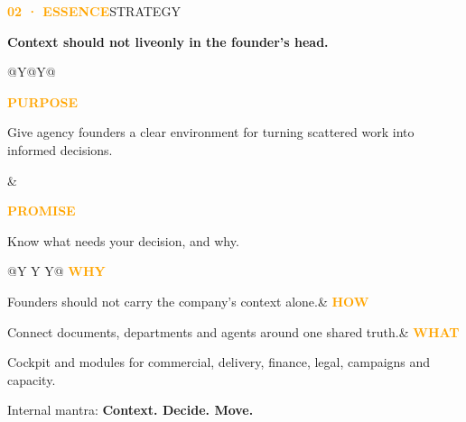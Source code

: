 \documentclass[a4paper,10pt]{article}
\newcommand{\PageLabel}[2]{\noindent\textcolor{orange}{\footnotesize\bfseries #1}\hfill\textcolor{ink!55}{\footnotesize #2}\par\vspace{5mm}}
\newcommand{\Title}[1]{{\displayfont\bfseries\fontsize{34}{38}\selectfont\color{ink}#1\par}}
\newcommand{\Sub}[1]{{\fontsize{13}{19}\selectfont\color{ink!75}#1\par}}
\begin{document}
\PageLabel{02 · ESSENCE}{STRATEGY}
\Title{Context should not live\newline only in the founder’s head.}
\vspace{7mm}
\begin{tabularx}{\textwidth}{@{}Y@{\hspace{10mm}}Y@{}}
\begin{card}[colback=cream,colframe=cream]\textcolor{orange}{\bfseries PURPOSE}\par\vspace{3mm}\large Give agency founders a clear environment for turning scattered work into informed decisions.\end{card}&
\begin{card}\textcolor{orange}{\bfseries PROMISE}\par\vspace{3mm}\large Know what needs your decision, and why.\end{card}
\end{tabularx}
\vspace{8mm}
\begin{tabularx}{\textwidth}{@{}Y Y Y@{}}
\textcolor{orange}{\bfseries WHY}\par\small Founders should not carry the company’s context alone.&
\textcolor{orange}{\bfseries HOW}\par\small Connect documents, departments and agents around one shared truth.&
\textcolor{orange}{\bfseries WHAT}\par\small Cockpit and modules for commercial, delivery, finance, legal, campaigns and capacity.
\end{tabularx}
\vfill\Sub{Internal mantra: \textbf{Context. Decide. Move.}}\newpage
\end{document}
